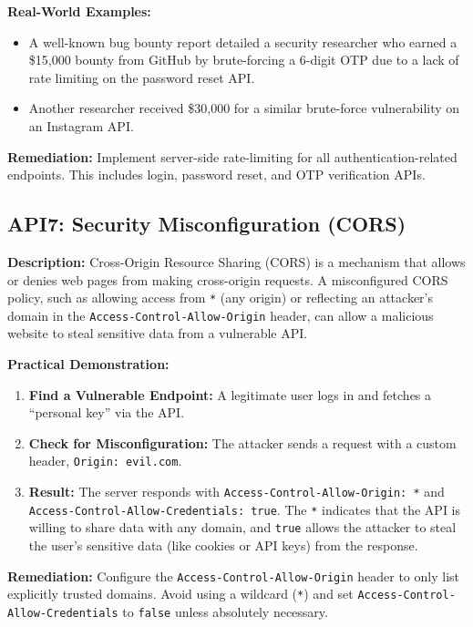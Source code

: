 \documentclass[12pt]{article}
\begin{document}
\textbf{Real-World Examples:}
\begin{itemize}
  \item A well-known bug bounty report detailed a security researcher who earned a \${}15{,}000
  bounty from GitHub by brute-forcing a 6-digit OTP due to a lack of rate limiting on
  the password reset API.
  \item Another researcher received \${}30{,}000 for a similar brute-force vulnerability on an
  Instagram API.
\end{itemize}

\textbf{Remediation:} Implement server-side rate-limiting for all authentication-related endpoints.
This includes login, password reset, and OTP verification APIs.

\subsection*{API7: Security Misconfiguration (CORS)}
\textbf{Description:} Cross-Origin Resource Sharing (CORS) is a mechanism that allows or denies
web pages from making cross-origin requests. A misconfigured CORS policy, such as allowing
access from \texttt{*} (any origin) or reflecting an attacker's domain in the \texttt{Access-Control-Allow-Origin}
header, can allow a malicious website to steal sensitive data from a vulnerable API.

\textbf{Practical Demonstration:}
\begin{enumerate}
  \item \textbf{Find a Vulnerable Endpoint:} A legitimate user logs in and fetches a ``personal key''
  via the API.
  \item \textbf{Check for Misconfiguration:} The attacker sends a request with a custom header,
  \texttt{Origin: evil.com}.
  \item \textbf{Result:} The server responds with \texttt{Access-Control-Allow-Origin: *} and \texttt{Access-Control-Allow-Credentials: true}. The \texttt{*} indicates that the API is willing to share data with any
  domain, and \texttt{true} allows the attacker to steal the user's sensitive data (like cookies or
  API keys) from the response.
\end{enumerate}

\textbf{Remediation:} Configure the \texttt{Access-Control-Allow-Origin} header to only list explicitly
trusted domains. Avoid using a wildcard (\texttt{*}) and set \texttt{Access-Control-Allow-Credentials} to \texttt{false}
unless absolutely necessary.
\end{document}
